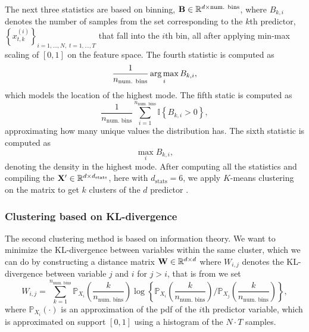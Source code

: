 \documentclass{statsmsc}
\begin{document}
The next three statistics are based on binning, $\mathbf{B} \in \mathbb{R}^{d \times \textrm{num. bins}}$,
where $B_{k,i}$ denotes the number of samples from the set corresponding to the
$k$th predictor, $\left\{x_{t,k}^{(i)} \right\}_{i=1,\dots,N,\;t=1,\dots,T}$
that fall into the $i$th bin, all after applying min-max scaling of $[0,1]$ on the feature
space. The fourth statistic is computed as
\begin{equation}
    \frac{1}{n_{\textrm{num. bins} }}  \operatorname*{arg\,max}_{i} B_{k,i},
\end{equation}
which models the location of the highest mode.
The fifth static is computed as
\begin{equation}
    \frac{1}{n_{\textrm{num. bins} }}  \sum^{n_{\textrm{num. bins} }}_{i=1} \mathbb{I}\left\{
        B_{k,i} > 0
    \right\},
\end{equation}
approximating how many unique values the distribution has. The sixth statistic is computed as
\begin{equation}
     \max_{i} B_{k,i},
\end{equation}
denoting the density in the highest mode.
After computing all the statistics and compiling the $\mathbf{X}' \in \mathbb{R}^{d \times d_{\textrm{stats} }}$,
here with $d_{\textrm{stats}}=6$, we apply $K$-means clustering on the matrix to get $k$ clusters
of the $d$ predictor \citep{kmeans}.

\subsubsection{Clustering based on KL-divergence}%
\label{sub:Clustering based on KL-divergence}

The second clustering method is based on information theory. We want to minimize the KL-divergence
between variables within the same cluster, which we can do by constructing a
distance matrix $\mathbf{W} \in \mathbb{R}^{d \times d}$ where $W_{i,j}$ denotes the
\ac{KL-divergence} between variable $j$ and $i$ for $j > i$, that is
from \citep{mackay} we set
\begin{equation}
    W_{i,j}= \sum^{n_{\textrm{num. bins} }}_{k=1} \mathbb{P}_{X_i}\left( \frac{k}{n_{\textrm{num. bins} }}  \right)
    \log\left\{
    \mathbb{P}_{X_i}\left( \frac{k}{n_{\textrm{num. bins} }}  \right) \bigg/
    \mathbb{P}_{X_j}\left( \frac{k}{n_{\textrm{num. bins} }}  \right)
\right\},
\end{equation}
where $\mathbb{P}_{X_i}(\cdot)$ is an approximation of the \ac{pdf} of the $i$th predictor variable,
which is approximated on support $[0,1]$ using a histogram of the $N \cdot T$ samples.
\end{document}
